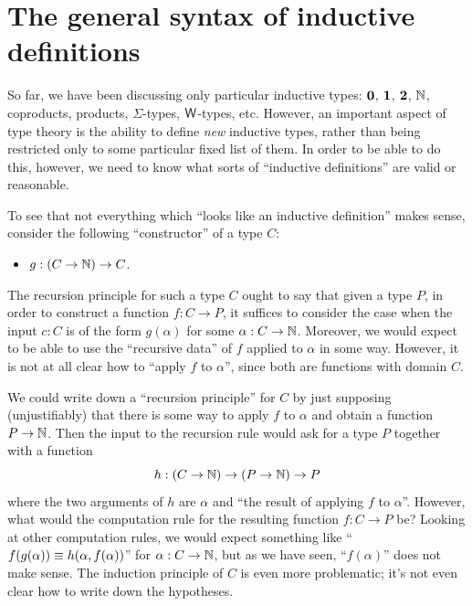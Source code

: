 
\section{The general syntax of inductive definitions}
\label{sec:strictly-positive}

%
%

So far, we have been discussing only particular inductive types: $\mathbf{0}$, $\mathbf{1}$, $\mathbf{2}$, $\mathbb{N}$, coproducts, products, $\Sigma$-types, $\mathsf{W}$-types, etc.
However, an important aspect of type theory is the ability to define \emph{new} inductive types, rather than being restricted only to some particular fixed list of them.
In order to be able to do this, however, we need to know what sorts of ``inductive definitions'' are valid or reasonable.

To see that not everything which ``looks like an inductive definition'' makes sense, consider the following ``constructor'' of a type $C$:
\begin{itemize}
\item $g:(C\to \mathbb{N}) \to C$.
\end{itemize}
The recursion principle for such a type $C$ ought to say that given a type $P$, in order to construct a function $f:C\to P$, it suffices to consider the case when the input $c:C$ is of the form $g(\alpha)$ for some $\alpha:C\to\mathbb{N}$.
Moreover, we would expect to be able to use the ``recursive data'' of $f$ applied to $\alpha$ in some way.
However, it is not at all clear how to ``apply $f$ to $\alpha$'', since both are functions with domain $C$.

We could write down a ``recursion principle'' for $C$ by just supposing (unjustifiably) that there is some way to apply $f$ to $\alpha$ and obtain a function $P\to\mathbb{N}$.
Then the input to the recursion rule would ask for a type $P$ together with a function
\begin{equation}
  h:(C\to\mathbb{N}) \to (P\to\mathbb{N}) \to P\label{eq:fake-recursor}
\end{equation}
where the two arguments of $h$ are $\alpha$ and ``the result of applying $f$ to $\alpha$''.
However, what would the computation rule for the resulting function $f:C\to P$ be?
Looking at other computation rules, we would expect something like ``$f(g(\alpha)) \equiv h(\alpha,f(\alpha))$'' for $\alpha:C\to\mathbb{N}$, but as we have seen, ``$f(\alpha)$'' does not make sense.
The induction principle of $C$ is even more problematic; it's not even clear how to write down the hypotheses.

